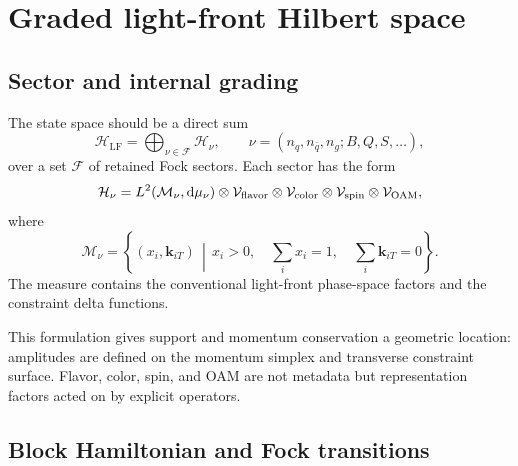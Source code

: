 \documentclass[11pt]{article}
\newcommand{\dd}{\mathrm{d}}
\newcommand{\Hil}{\mathcal H}
\newcommand{\Rep}{\mathcal V}
\newcommand{\LF}{\mathrm{LF}}
\begin{document}
\section{Graded light-front Hilbert space}

\subsection{Sector and internal grading}

The state space should be a direct sum
\begin{equation}
\Hil_{\LF}
=
\bigoplus_{\nu\in\mathcal F}\Hil_\nu,
\qquad
\nu=(n_q,n_{\bar q},n_g;B,Q,S,\ldots),
\label{eq:graded-hilbert}
\end{equation}
over a set \(\mathcal F\) of retained Fock sectors.  Each sector has the
form
\begin{equation}
\Hil_\nu
=
L^2(\mathcal M_\nu,\dd\mu_\nu)
\otimes\Rep_{\rm flavor}
\otimes\Rep_{\rm color}
\otimes\Rep_{\rm spin}
\otimes\Rep_{\rm OAM},
\label{eq:sector-space}
\end{equation}
where
\begin{equation}
\mathcal M_\nu=
\left\{(x_i,\bm k_{iT})\,\middle|\,
x_i>0,\quad
\sum_i x_i=1,\quad
\sum_i\bm k_{iT}=0
\right\}.
\label{eq:momentum-manifold}
\end{equation}
The measure contains the conventional light-front phase-space factors and
the constraint delta functions.

This formulation gives support and momentum conservation a geometric
location: amplitudes are defined on the momentum simplex and transverse
constraint surface.  Flavor, color, spin, and OAM are not metadata but
representation factors acted on by explicit operators.

\subsection{Block Hamiltonian and Fock transitions}
\end{document}
